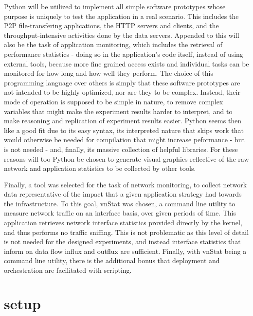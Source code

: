     Python \cite{python} will be utilized to implement all simple software prototypes whose purpose is uniquely to test the application in a real scenario.
    This includes the P2P file-transfering applications, the HTTP servers and clients, and the throughput-intensive activities done by the data servers.
    Appended to this will also be the task of application monitoring, which includes the retrieval of performance statistics - doing so in the application's code itself, instead of using external tools, because more fine grained access exists and individual tasks can be monitored for how long and how well they perform.
    The choice of this programming language over others is simply that these software prototypes are not intended to be highly optimized, nor are they to be complex.
    Instead, their mode of operation is supposed to be simple in nature, to remove complex variables that might make the experiment results harder to interpret, and to make reasoning and replication of experiment results easier.
    Python seems then like a good fit due to its easy syntax, its interpreted nature that skips work that would otherwise be needed for compilation that might increase peformance - but is not needed - and, finally, its massive collection of helpful libraries.
    For these reasons will too Python be chosen to generate visual graphics reflective of the raw network and application statistics to be collected by other tools.

    Finally, a tool was selected for the task of network monitoring, to collect network data representative of the impact that a given application strategy had towards the infrastructure.
    To this goal, vnStat \cite{vnstat} was chosen, a command line utility to measure network traffic on an interface basis, over given periods of time.
    This application retrieves network interface statistics provided directly by the kernel, and thus performs no traffic sniffing.
    This is not problematic as this level of detail is not needed for the designed experiments, and instead interface statistics that inform on data flow influx and outflux are sufficient.
    Finally, with vnStat being a command line utility, there is the additional bonus that deployment and orchestration are facilitated with scripting.

\section{setup}

